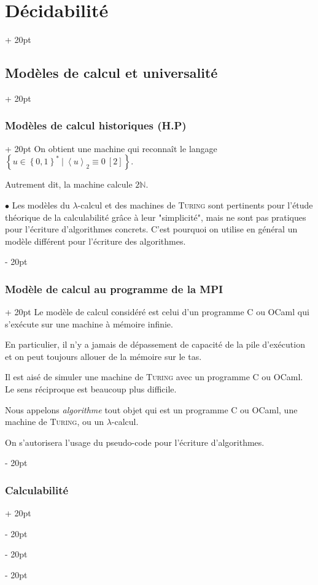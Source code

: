 \documentclass[a4paper, 12pt, twoside]{article}
\newcommand{\N}{\mathbb{N}} %
\newcommand{\set}[1]{\left\{ #1 \right\}}
\newcommand{\lrangle}[1]{\left\langle #1 \right\rangle}
\newcommand{\ind}[1][20pt]{\advance\leftskip + #1}
\newcommand{\deind}[1][20pt]{\advance\leftskip - #1}
\newenvironment{indt}[2][20pt]{#2 \par \ind[#1]}{\par \deind} %
\begin{document}
\begin{indt}{\section{Décidabilité}}
\begin{indt}{\subsection{Modèles de calcul et universalité}}
\begin{indt}{\subsubsection{Modèles de calcul historiques (H.P)}}
                 On obtient une machine qui reconnaît le langage $\set{u \in \set{0, 1}^*\ |\ \lrangle u _2 \equiv 0\ [2]}$.

                 Autrement dit, la machine calcule $2\N$.

                 \vspace{12pt}
                 
                 $\bullet$ Les modèles du $\lambda$-calcul et des machines de \textsc{Turing} sont pertinents pour l'étude théorique de la calculabilité grâce à leur "simplicité", mais ne sont pas pratiques pour l'écriture d'algorithmes concrets. C'est pourquoi on utilise en général un modèle différent pour l'écriture des algorithmes.
            \end{indt}

            \vspace{12pt}
            
            \begin{indt}{\subsubsection{Modèle de calcul au programme de la MPI}}
                Le modèle de calcul considéré est celui d'un programme C ou OCaml qui s'exécute sur une machine à mémoire infinie.

                En particulier, il n'y a jamais de dépassement de capacité de la pile d'exécution et on peut toujours allouer de la mémoire sur le tas.

                Il est aisé de simuler une machine de \textsc{Turing} avec un programme C ou OCaml.
                Le sens réciproque est beaucoup plus difficile.

                Nous appelons \emph{algorithme} tout objet qui est un programme C ou OCaml, une machine de \textsc{Turing}, ou un $\lambda$-calcul.

                On s'autorisera l'usage du pseudo-code pour l'écriture d'algorithmes.
            \end{indt}

            \vspace{12pt}
            
            \begin{indt}{\subsubsection{Calculabilité}}
                \label{1.1.4}


\end{indt}
\end{indt}
\end{indt}
\end{document}
